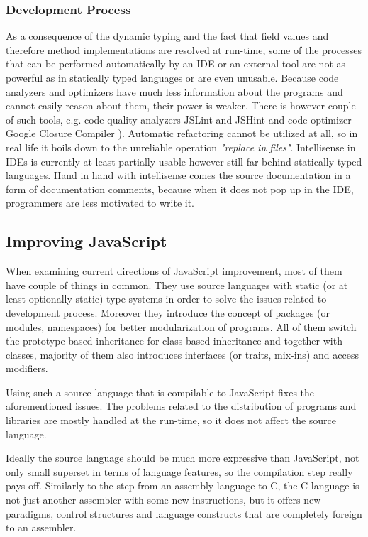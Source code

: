 \documentclass[12pt,a4paper]{report}
\begin{document}
\subsubsection*{Development Process} 

As a consequence of the dynamic typing and the fact that field values and therefore method implementations are resolved at run-time, some of the processes that can be performed automatically by an IDE or an external tool are not as powerful as in statically typed languages or are even unusable. Because code analyzers and optimizers have much less information about the programs and cannot easily reason about them, their power is weaker. There is however couple of such tools, e.g. code quality analyzers JSLint \cite{JsLint} and JSHint \cite{JsHint} and code optimizer Google Closure Compiler \cite{GoogleClosure}). Automatic refactoring cannot be utilized at all, so in real life it boils down to the unreliable operation {\it "replace in files"}. Intellisense in IDEs is currently at least partially usable however still far behind statically typed languages. Hand in hand with intellisense comes the source documentation in a form of documentation comments, because when it does not pop up in the IDE, programmers are less motivated to write it.

\subsection{Improving JavaScript}

When examining current directions of JavaScript improvement, most of them have couple of things in common. They use source languages with static (or at least optionally static) type systems in order to solve the issues related to development process. Moreover they introduce the concept of packages (or modules, namespaces) for better modularization of programs. All of them switch the prototype-based inheritance for class-based inheritance and together with classes, majority of them also introduces interfaces (or traits, mix-ins) and access modifiers.

Using such a source language that is compilable to JavaScript fixes the aforementioned issues. The problems related to the distribution of programs and libraries are mostly handled at the run-time, so it does not affect the source language.

Ideally the source language should be much more expressive than JavaScript, not only small superset in terms of language features, so the compilation step really pays off. Similarly to the step from an assembly language to C, the C language is not just another assembler with some new instructions, but it offers new paradigms, control structures and language constructs that are completely foreign to an assembler.
\end{document}
